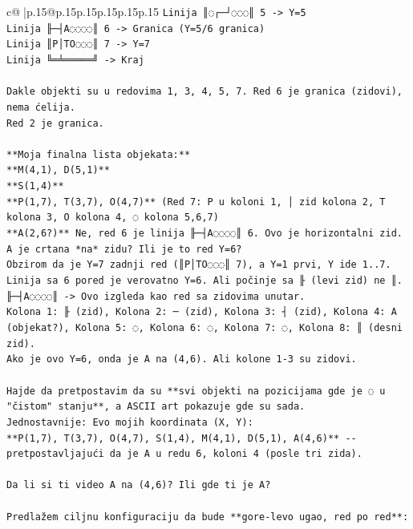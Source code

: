 \documentclass{article}
\begin{document}
{\begin{supertabular}{c@{$\;$}|p{.15\linewidth}@{}p{.15\linewidth}p{.15\linewidth}p{.15\linewidth}p{.15\linewidth}p{.15\linewidth}}
{{{\texttt{Linija ║◌┌─┘◌◌◌║ 5 {-}> Y=5} \\
\texttt{Linija ╟─┤A◌◌◌◌║ 6 {-}> Granica (Y=5/6 granica)} \\
\texttt{Linija ║P│TO◌◌◌║ 7 {-}> Y=7} \\
\texttt{Linija ╚═╧═════╝ {-}> Kraj} \\
\\ 
\texttt{Dakle objekti su u redovima 1, 3, 4, 5, 7. Red 6 je granica (zidovi), nema ćelija.} \\
\texttt{Red 2 je granica.} \\
\\ 
\texttt{**Moja finalna lista objekata:**} \\
\texttt{**M(4,1), D(5,1)**} \\
\texttt{**S(1,4)**} \\
\texttt{**P(1,7), T(3,7), O(4,7)**  (Red 7: P u koloni 1, │ zid kolona 2, T kolona 3, O kolona 4, ◌ kolona 5,6,7)} \\
\texttt{**A(2,6?)** Ne, red 6 je linija ╟─┤A◌◌◌◌║ 6. Ovo je horizontalni zid. A je crtana *na* zidu? Ili je to red Y=6?} \\
\texttt{Obzirom da je Y=7 zadnji red (║P│TO◌◌◌║ 7), a Y=1 prvi, Y ide 1..7.} \\
\texttt{Linija sa 6 pored je verovatno Y=6. Ali počinje sa ╟ (levi zid) ne ║.} \\
\texttt{╟─┤A◌◌◌◌║ {-}> Ovo izgleda kao red sa zidovima unutar.} \\
\texttt{Kolona 1: ╟ (zid), Kolona 2: ─ (zid), Kolona 3: ┤ (zid), Kolona 4: A (objekat?), Kolona 5: ◌, Kolona 6: ◌, Kolona 7: ◌, Kolona 8: ║ (desni zid).} \\
\texttt{Ako je ovo Y=6, onda je A na (4,6). Ali kolone 1{-}3 su zidovi.} \\
\\ 
\texttt{Hajde da pretpostavim da su **svi objekti na pozicijama gde je ◌ u "čistom" stanju**, a ASCII art pokazuje gde su sada.} \\
\texttt{Jednostavnije: Evo mojih koordinata (X, Y):} \\
\texttt{**P(1,7), T(3,7), O(4,7), S(1,4), M(4,1), D(5,1), A(4,6)** {-}{-} pretpostavljajući da je A u redu 6, koloni 4 (posle tri zida).} \\
\\ 
\texttt{Da li si ti video A na (4,6)? Ili gde ti je A?} \\
\\ 
\texttt{Predlažem ciljnu konfiguraciju da bude **gore{-}levo ugao, red po red**:} \\
}}}
\end{supertabular}}
\end{document}
